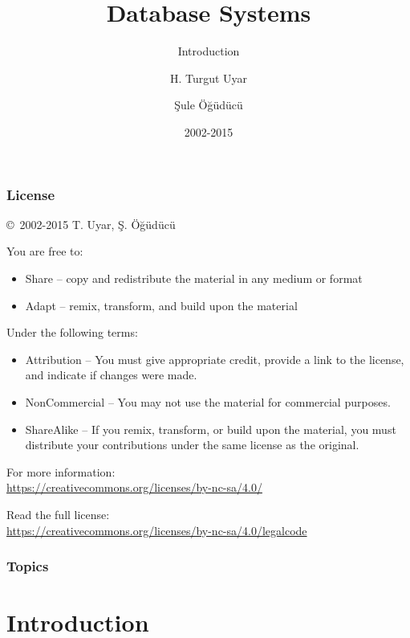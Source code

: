 \documentclass[dvipsnames]{beamer}
\title{Database Systems}
\subtitle{Introduction}
\author{H. Turgut Uyar \and Şule Öğüdücü}
\date{2002-2015}
\theoremstyle{plain}
\begin{document}
\begin{frame}
  \titlepage
\end{frame}

\begin{frame}
  \frametitle{License}

  \hfill
  \copyright~2002-2015 T. Uyar, Ş. Öğüdücü

  \vfill
  \begin{footnotesize}
    You are free to:
    \begin{itemize}
      \itemsep0em
      \item Share -- copy and redistribute the material in any medium or format
      \item Adapt -- remix, transform, and build upon the material
    \end{itemize}

    Under the following terms:
    \begin{itemize}
      \itemsep0em
      \item Attribution -- You must give appropriate credit, provide a link to
        the license, and indicate if changes were made.

      \item NonCommercial -- You may not use the material for commercial
        purposes.

      \item ShareAlike -- If you remix, transform, or build upon the material,
        you must distribute your contributions under the same license as the
        original.
    \end{itemize}
  \end{footnotesize}

  \begin{small}
    For more information:\\
    \url{https://creativecommons.org/licenses/by-nc-sa/4.0/}

    \smallskip
    Read the full license:\\
    \url{https://creativecommons.org/licenses/by-nc-sa/4.0/legalcode}
  \end{small}
\end{frame}

\begin{frame}
  \frametitle{Topics}
  \tableofcontents
\end{frame}

\section{Introduction}
\end{document}
